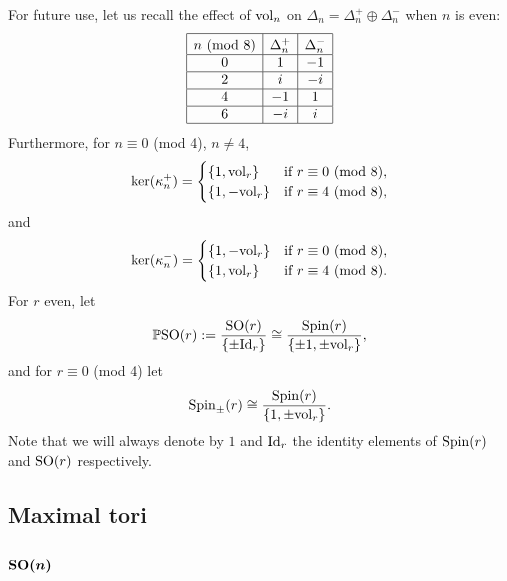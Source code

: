 \documentclass[pdftex]{sigma}
\newcommand\tstrut{\rule{0pt}{2.6ex}}
\numberwithin{equation}{section}
\begin{document}
For future use, let us recall the ef\/fect of ${\rm vol}_n$ on $\Delta_n= \Delta_n^+ \oplus \Delta_n^-$ when $n$ is even:
\begin{gather*}\begin{array}{|c|c|c|}\hline
n\,\,\text{(mod 8)} & \Delta_n^+ & \Delta_n^- \tstrut\\\hline
0 & 1 & -1\\\hline
2 & i & -i\\\hline
4 & -1 & 1\\\hline
6 & -i & i \\\hline
 \end{array}
\end{gather*}
Furthermore, for $n\equiv 0$ (mod 4), $n\not =4$,
\begin{gather*}\ker(\kappa_n^+)= \begin{cases}
\{1,{\rm vol}_r\} & \text{if $r\equiv 0$ (mod 8)},\\
\{1,-{\rm vol}_r\} & \text{if $r\equiv 4$ (mod 8)},
 \end{cases}\end{gather*}
and
\begin{gather*}\ker(\kappa_n^-)= \begin{cases}
\{1,-{\rm vol}_r\} & \text{if $r\equiv 0$ (mod 8)},\\
\{1,{\rm vol}_r\} & \text{if $r\equiv 4$ (mod 8)}.
 \end{cases}\end{gather*}
For $r$ even, let
\begin{gather*}
\mathbb{P}{\rm SO}(r):= {{\rm SO}(r)\over\{\pm {\rm Id}_r\}}\cong {{\rm Spin}(r)\over\{\pm 1,\pm{\rm vol}_r\}},
\end{gather*}
and for $r\equiv 0$ (mod 4) let
\begin{gather*}
{\rm Spin}_\pm(r) \cong {{\rm Spin}(r)\over \{1, \pm{\rm vol}_r\} }.
\end{gather*}
Note that we will always denote by $1$ and ${\rm Id}_r$ the identity elements of ${\rm Spin}(r)$ and ${\rm SO}(r)$ respectively.

\subsection{Maximal tori}

\subsubsection[${\rm SO}(n)$]{$\boldsymbol{{\rm SO}(n)}$}
\end{document}
